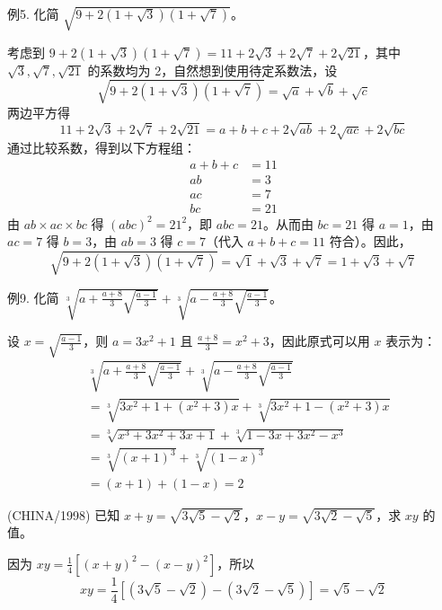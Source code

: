 \begin{questions}
\question 例5. 化简 $\sqrt{9+2(1+\sqrt{3})(1+\sqrt{7})}$。
\begin{solution}
考虑到 $9+2(1+\sqrt{3})(1+\sqrt{7})=11+2\sqrt{3}+2\sqrt{7}+2\sqrt{21}$，其中 $\sqrt{3}, \sqrt{7}, \sqrt{21}$ 的系数均为 2，自然想到使用待定系数法，设
\[
\sqrt{9+2(1+\sqrt{3})(1+\sqrt{7})}=\sqrt{a}+\sqrt{b}+\sqrt{c}
\]
两边平方得
\[
11+2\sqrt{3}+2\sqrt{7}+2\sqrt{21}=a+b+c+2\sqrt{ab}+2\sqrt{ac}+2\sqrt{bc}
\]
通过比较系数，得到以下方程组：
\begin{align*}
a+b+c &= 11 \\
ab &= 3 \\
ac &= 7 \\
bc &= 21
\end{align*}
由 $ab \times ac \times bc$ 得 $(abc)^2 = 21^2$，即 $abc=21$。从而由 $bc=21$ 得 $a=1$，由 $ac=7$ 得 $b=3$，由 $ab=3$ 得 $c=7$（代入 $a+b+c=11$ 符合）。因此，
\[
\sqrt{9+2(1+\sqrt{3})(1+\sqrt{7})}=\sqrt{1}+\sqrt{3}+\sqrt{7}=1+\sqrt{3}+\sqrt{7}
\]
\end{solution}

\question 例9. 化简 $\sqrt[3]{a+\frac{a+8}{3}\sqrt{\frac{a-1}{3}}}+\sqrt[3]{a-\frac{a+8}{3}\sqrt{\frac{a-1}{3}}}$。
\begin{solution}
设 $x=\sqrt{\frac{a-1}{3}}$，则 $a=3x^2+1$ 且 $\frac{a+8}{3}=x^2+3$，因此原式可以用 $x$ 表示为：
\begin{align*}
&\sqrt[3]{a+\frac{a+8}{3}\sqrt{\frac{a-1}{3}}}+\sqrt[3]{a-\frac{a+8}{3}\sqrt{\frac{a-1}{3}}} \\
&= \sqrt[3]{3x^2+1+(x^2+3)x}+\sqrt[3]{3x^2+1-(x^2+3)x} \\
&= \sqrt[3]{x^3+3x^2+3x+1}+\sqrt[3]{1-3x+3x^2-x^3} \\
&= \sqrt[3]{(x+1)^3}+\sqrt[3]{(1-x)^3} \\
&= (x+1)+(1-x)=2
\end{align*}
\end{solution}

\question (CHINA/1998) 已知 $x+y=\sqrt{3\sqrt{5}-\sqrt{2}}$，$x-y=\sqrt{3\sqrt{2}-\sqrt{5}}$，求 $xy$ 的值。
\begin{solution}
因为 $xy=\frac{1}{4}\left[\left(x+y\right)^2-\left(x-y\right)^2\right]$，所以
\[
xy = \frac{1}{4}\left[\left(3\sqrt{5}-\sqrt{2}\right)-\left(3\sqrt{2}-\sqrt{5}\right)\right] = \sqrt{5}-\sqrt{2}
\]
\end{solution}


\end{questions}
